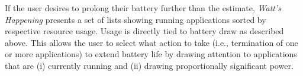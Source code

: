 
If the user desires to prolong their battery further than the estimate, \emph{Watt's Happening} presents a set of lists showing running applications sorted by respective resource usage.
Usage is directly tied to battery draw as described above. 
This allows the user to select what action to take (i.e., termination of one or more applications) to extend battery life by drawing attention to applications that are (i) currently running and (ii) drawing proportionally significant power.






